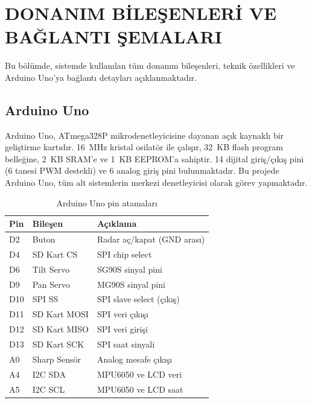 ﻿\section{DONANIM BİLEŞENLERİ VE BAĞLANTI ŞEMALARI}

Bu bölümde, sistemde kullanılan tüm donanım bileşenleri, teknik özellikleri ve Arduino Uno'ya bağlantı detayları açıklanmaktadır.

\subsection{Arduino Uno}

Arduino Uno, ATmega328P mikrodenetleyicisine dayanan açık kaynaklı bir geliştirme kartıdır. 16~MHz kristal osilatör ile çalışır, 32~KB flash program belleğine, 2~KB SRAM'e ve 1~KB EEPROM'a sahiptir. 14 dijital giriş/çıkış pini (6 tanesi PWM destekli) ve 6 analog giriş pini bulunmaktadır. Bu projede Arduino Uno, tüm alt sistemlerin merkezi denetleyicisi olarak görev yapmaktadır.

\begin{table}[H]
    \centering
    \small
    \renewcommand{\arraystretch}{0.9}
    \caption{Arduino Uno pin atamaları}
    \label{tab:pin_atama}
    \begin{tabular}{|l|l|l|}
        \hline
        \textbf{Pin} & \textbf{Bileşen} & \textbf{Açıklama} \\
        \hline
        D2 & Buton & Radar aç/kapat (GND arası) \\
        \hline
        D4 & SD Kart CS & SPI chip select \\
        \hline
        D6 & Tilt Servo & SG90S sinyal pini \\
        \hline
        D9 & Pan Servo & MG90S sinyal pini \\
        \hline
        D10 & SPI SS & SPI slave select (çıkış) \\
        \hline
        D11 & SD Kart MOSI & SPI veri çıkışı \\
        \hline
        D12 & SD Kart MISO & SPI veri girişi \\
        \hline
        D13 & SD Kart SCK & SPI saat sinyali \\
        \hline
        A0 & Sharp Sensör & Analog mesafe çıkışı \\
        \hline
        A4 & I2C SDA & MPU6050 ve LCD veri \\
        \hline
        A5 & I2C SCL & MPU6050 ve LCD saat \\
        \hline
    \end{tabular}
\end{table}

